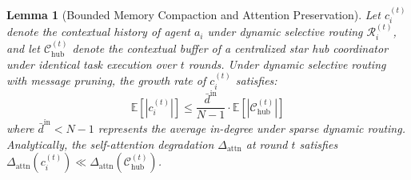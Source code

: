 \documentclass{ieeeaccess}
\newtheorem{lemma}{Lemma}
\begin{document}
\begin{lemma}[Bounded Memory Compaction and Attention Preservation]
\label{lem:memory_compaction}
Let $c_i^{(t)}$ denote the contextual history of agent $a_i$ under dynamic selective routing $\mathcal{R}_i^{(t)}$, and let $\mathcal{C}_{\text{hub}}^{(t)}$ denote the contextual buffer of a centralized star hub coordinator under identical task execution over $t$ rounds. Under dynamic selective routing with message pruning, the growth rate of $c_i^{(t)}$ satisfies:
\begin{equation}
\label{eq:memory_compaction_bound}
\mathbb{E}[|c_i^{(t)}|] \le \frac{\bar{d}^{\text{in}}}{N-1} \cdot \mathbb{E}[|\mathcal{C}_{\text{hub}}^{(t)}|]
\end{equation}
where $\bar{d}^{\text{in}} < N-1$ represents the average in-degree under sparse dynamic routing. Analytically, the self-attention degradation $\Delta_{\text{attn}}$ at round $t$ satisfies $\Delta_{\text{attn}}(c_i^{(t)}) \ll \Delta_{\text{attn}}(\mathcal{C}_{\text{hub}}^{(t)})$.
\end{lemma}
\end{document}
